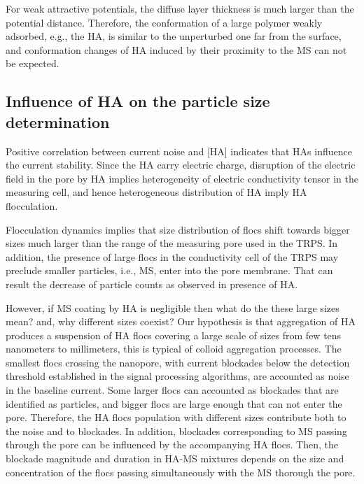 \documentclass[journal=langd5,manuscript=article]{achemso}
\begin{document}
For weak attractive potentials, the diffuse layer thickness is much larger than the potential distance. Therefore, the conformation of a large  polymer weakly adsorbed, e.g., the HA, is similar to the unperturbed one far from the surface\cite{Netz2003}, and conformation changes of HA induced by their proximity to the MS can not be expected.



\subsection{Influence of HA on the particle size determination}


Positive correlation between current noise and [HA] indicates that HAs influence the current stability.  Since the HA carry electric charge, disruption of the electric field in the pore by HA implies  heterogeneity of electric conductivity tensor in the measuring cell, and hence heterogeneous distribution of HA imply HA flocculation. 

Flocculation dynamics implies that  size distribution of flocs shift towards bigger sizes much larger than the range of the measuring pore used in the TRPS. In addition, the presence of large flocs in the conductivity cell of the TRPS may preclude smaller particles, i.e., MS, enter into the pore membrane. That can result the  decrease of particle counts as observed in presence of HA.





However, if MS coating by HA is negligible then what do the these large sizes mean? and, why different sizes coexist?
Our hypothesis is that aggregation of HA produces  a suspension of HA flocs covering a large scale of sizes from few tens nanometers to millimeters, this is typical of colloid aggregation processes.  The smallest flocs crossing the nanopore, with current blockades below the  detection threshold established in the signal processing algorithms, are accounted as noise in the baseline current. Some larger flocs can accounted as blockades that are identified as particles, and bigger flocs are large enough that can not enter the pore.
Therefore, the HA flocs population with different sizes contribute both to the noise and to blockades.
In addition, blockades corresponding to MS passing through the pore can be  influenced by the accompanying HA flocs. Then, the blockade magnitude and duration in HA-MS mixtures depends on the size and concentration of the flocs passing simultaneously with the MS thorough the pore.
\end{document}
